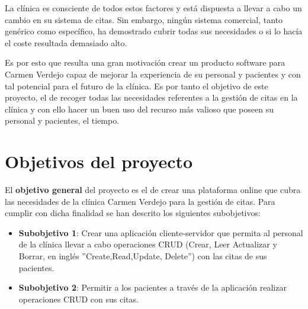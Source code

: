La clínica es consciente de todos estos factores y está dispuesta a llevar a cabo un cambio en su sistema de citas. Sin embargo, ningún sistema comercial, tanto genérico como específico, ha demostrado cubrir todas sus necesidades o si lo hacía el coste resultada demasiado alto. \bigskip

Es por esto que resulta una gran motivación crear un producto software para Carmen Verdejo capaz de mejorar la experiencia de su personal y pacientes y con tal potencial para el futuro de la clínica. Es por tanto el objetivo de este proyecto, el de recoger todas las necesidades referentes a la gestión de citas en la clínica y con ello hacer un buen uso del recurso más valioso que poseen su personal y pacientes, el tiempo. \bigskip


\section{Objetivos del proyecto}
El \textbf{objetivo general} del proyecto es el de crear una plataforma online que cubra las necesidades de la clínica Carmen Verdejo para la gestión de citas. Para cumplir con dicha finalidad se han descrito los siguientes subobjetivos:

\begin{itemize}
    \item \textbf{Subobjetivo 1}: Crear una aplicación cliente-servidor que permita al personal de la clínica llevar a cabo operaciones CRUD (Crear, Leer Actualizar y Borrar, en inglés ''Create,Read,Update, Delete'') con las citas de sus pacientes.
    \item \textbf{Subobjetivo 2}: Permitir a los pacientes a través de la aplicación realizar operaciones CRUD con sus citas.
\end{itemize}

